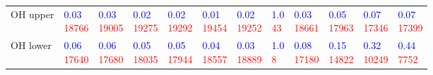 \begin{tabular}{llllllllllll}
OH upper    &  \makecell{\textcolor{blue}{0.03} \\ \textcolor{red}{18766}} &  \makecell{\textcolor{blue}{0.03} \\ \textcolor{red}{19005}} &  \makecell{\textcolor{blue}{0.02} \\ \textcolor{red}{19275}} &  \makecell{\textcolor{blue}{0.02} \\ \textcolor{red}{19292}} &  \makecell{\textcolor{blue}{0.01} \\ \textcolor{red}{19454}} &  \makecell{\textcolor{blue}{0.02} \\ \textcolor{red}{19252}} &    \makecell{\textcolor{blue}{1.0} \\ \textcolor{red}{43}} &  \makecell{\textcolor{blue}{0.03} \\ \textcolor{red}{18661}} &  \makecell{\textcolor{blue}{0.05} \\ \textcolor{red}{17963}} &  \makecell{\textcolor{blue}{0.07} \\ \textcolor{red}{17346}} &  \makecell{\textcolor{blue}{0.07} \\ \textcolor{red}{17399}} \\
OH lower    &  \makecell{\textcolor{blue}{0.06} \\ \textcolor{red}{17640}} &  \makecell{\textcolor{blue}{0.06} \\ \textcolor{red}{17680}} &  \makecell{\textcolor{blue}{0.05} \\ \textcolor{red}{18035}} &  \makecell{\textcolor{blue}{0.05} \\ \textcolor{red}{17944}} &  \makecell{\textcolor{blue}{0.04} \\ \textcolor{red}{18557}} &  \makecell{\textcolor{blue}{0.03} \\ \textcolor{red}{18889}} &     \makecell{\textcolor{blue}{1.0} \\ \textcolor{red}{8}} &  \makecell{\textcolor{blue}{0.08} \\ \textcolor{red}{17180}} &  \makecell{\textcolor{blue}{0.15} \\ \textcolor{red}{14822}} &  \makecell{\textcolor{blue}{0.32} \\ \textcolor{red}{10249}} &   \makecell{\textcolor{blue}{0.44} \\ \textcolor{red}{7752}} \\

\end{tabular}
